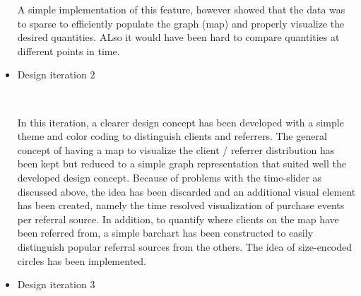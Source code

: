 \documentclass[12pt]{article}
\begin{document}
\begin{itemize}
A simple implementation of this feature, however showed that the data was to sparse to efficiently populate
the graph (map) and properly visualize the desired quantities. ALso it would have been hard to compare quantities
at different points in time.

\item Design iteration 2

\begin{center}
 \\
\end{center}

In this iteration, a clearer design concept has been developed with a simple theme and color coding to distinguish
clients and referrers. The general concept of having a map to visualize the client / referrer distribution has been
kept but reduced to a simple graph representation that suited well the developed design concept.
Because of problems with the time-slider as discussed above, the idea has been discarded and an additional visual
element has been created, namely the time resolved visualization of purchase events per referral source.
In addition, to quantify where clients on the map have been referred from, a simple barchart has been constructed to
easily distinguish popular referral sources from the others.
The idea of size-encoded circles has been implemented.

\item Design iteration 3



\end{itemize}
\end{document}
